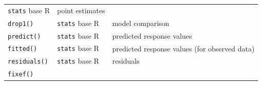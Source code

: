 \documentclass[]{book}
\begin{document}
\begin{longtable}[]{@{}lll@{}}
\begin{minipage}[t]{0.17\columnwidth}
\texttt{stats} base R\strut
\end{minipage} & \begin{minipage}[t]{0.58\columnwidth}\raggedright\strut
point estimates\strut
\end{minipage}\tabularnewline
\begin{minipage}[t]{0.16\columnwidth}\raggedright\strut
\texttt{drop1()}\strut
\end{minipage} & \begin{minipage}[t]{0.17\columnwidth}\raggedright\strut
\texttt{stats} base R\strut
\end{minipage} & \begin{minipage}[t]{0.58\columnwidth}\raggedright\strut
model comparison\strut
\end{minipage}\tabularnewline
\begin{minipage}[t]{0.16\columnwidth}\raggedright\strut
\texttt{predict()}\strut
\end{minipage} & \begin{minipage}[t]{0.17\columnwidth}\raggedright\strut
\texttt{stats} base R\strut
\end{minipage} & \begin{minipage}[t]{0.58\columnwidth}\raggedright\strut
predicted response values\strut
\end{minipage}\tabularnewline
\begin{minipage}[t]{0.16\columnwidth}\raggedright\strut
\texttt{fitted()}\strut
\end{minipage} & \begin{minipage}[t]{0.17\columnwidth}\raggedright\strut
\texttt{stats} base R\strut
\end{minipage} & \begin{minipage}[t]{0.58\columnwidth}\raggedright\strut
predicted response values (for observed data)\strut
\end{minipage}\tabularnewline
\begin{minipage}[t]{0.16\columnwidth}\raggedright\strut
\texttt{residuals()}\strut
\end{minipage} & \begin{minipage}[t]{0.17\columnwidth}\raggedright\strut
\texttt{stats} base R\strut
\end{minipage} & \begin{minipage}[t]{0.58\columnwidth}\raggedright\strut
residuals\strut
\end{minipage}\tabularnewline
\begin{minipage}[t]{0.16\columnwidth}\raggedright\strut
\texttt{fixef()}\strut

\end{minipage}
\end{longtable}
\end{document}
